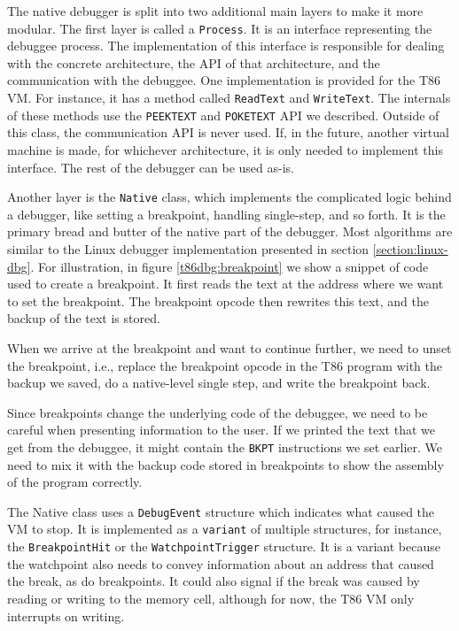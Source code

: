 The native debugger is split into two additional main layers to make it more
modular. The first layer is called a \texttt{Process}. It is an interface
representing the debuggee process. The implementation of this interface is
responsible for dealing with the concrete architecture, the API of that
architecture, and the communication with the debuggee. One implementation is
provided for the T86 VM. For instance, it has a method called \texttt{ReadText}
and \texttt{WriteText}. The internals of these methods use the
\texttt{PEEKTEXT} and \texttt{POKETEXT} API we described. Outside of this
class, the communication API is never used. If, in the future, another virtual
machine is made, for whichever architecture, it is only needed to implement
this interface. The rest of the debugger can be used as-is.

Another layer is the \texttt{Native} class, which implements the complicated
logic behind a debugger, like setting a breakpoint, handling single-step, and
so forth. It is the primary bread and butter of the native part of the
debugger. Most algorithms are similar to the Linux debugger implementation
presented in section \ref{section:linux-dbg}. For illustration, in figure
\ref{t86dbg:breakpoint} we show a snippet of code used to create a breakpoint.
It first reads the text at the address where we want to set the breakpoint. The
breakpoint opcode then rewrites this text, and the backup of the text is
stored.

When we arrive at the breakpoint and want to continue further, we need to unset
the breakpoint, i.e., replace the breakpoint opcode in the T86 program with the
backup we saved, do a native-level single step, and write the breakpoint back.

Since breakpoints change the underlying code of the debuggee, we need to be
careful when presenting information to the user. If we printed the text that we
get from the debuggee, it might contain the \texttt{BKPT} instructions we set
earlier. We need to mix it with the backup code stored in breakpoints to show
the assembly of the program correctly.

The Native class uses a \texttt{DebugEvent} structure which indicates what
caused the VM to stop. It is implemented as a \texttt{variant} of multiple
structures, for instance, the \texttt{BreakpointHit} or the
\texttt{WatchpointTrigger} structure. It is a variant because the watchpoint
also needs to convey information about an address that caused the break, as do
breakpoints. It could also signal if the break was caused by reading or writing
to the memory cell, although for now, the T86 VM only interrupts on writing.


